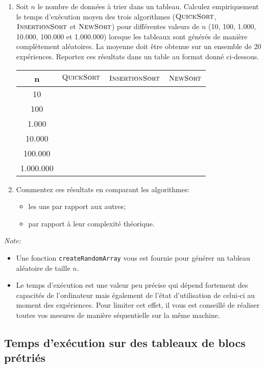 \documentclass[a4paper,10pt]{article}
\begin{document}
\begin{enumerate}
\item Soit $n$ le nombre de données à trier dans un tableau. Calculez
empiriquement le temps d'exécution moyen des trois algorithmes
($\textnormal{\scshape QuickSort}$, $\textnormal{\scshape InsertionSort}$ et $\textnormal{\scshape NewSort}$) pour
différentes valeurs de $n$ (10, 100, 1.000, 10.000, 100.000 et
1.000.000) lorsque les tableaux sont générés de manière complètement
aléatoires. La moyenne doit être obtenue sur un ensemble de 20
expériences. Reportez ces résultats dans un table au format donné ci-dessous.

\begin{center}
\begin{tabular}{cccc}
	\hline
	n & $\textnormal{\scshape QuickSort}$ & $\textnormal{\scshape InsertionSort}$ & $\textnormal{\scshape NewSort}$ \\
	\hline
	10 & & & \\
	100 & & &\\
	1.000 & & &\\
	10.000 & & &\\
	100.000 & & &\\
	1.000.000 & & &\\
\end{tabular}
\end{center}

\item Commentez ces résultats en comparant les algorithmes:
\begin{itemize}
\item les uns par rapport aux autres;
\item par rapport à leur complexité théorique.
\end{itemize}
\end{enumerate}

{\em Note:}
\begin{itemize}
\item Une fonction \texttt{createRandomArray} vous est fournie pour générer un tableau aléatoire de taille $n$.
\item Le temps d'exécution est une valeur peu précise qui dépend fortement
des capacités de l'ordinateur mais également de l'état d'utilisation de celui-ci
au moment des expériences. Pour limiter cet effet, il vous est conseillé
de réaliser toutes vos mesures de manière séquentielle sur la même machine.
\end{itemize}

\subsection{Temps d'exécution sur des tableaux de blocs prétriés}
\end{document}

